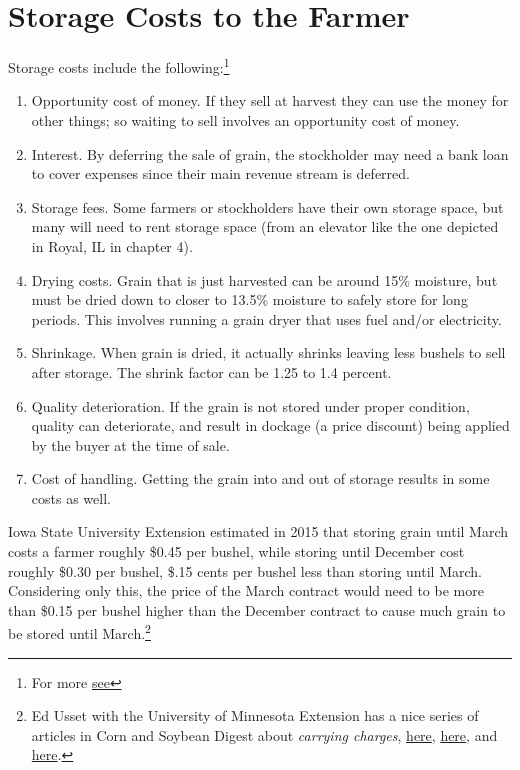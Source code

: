 \documentclass[
]{book}
\providecommand{\tightlist}{%
  \setlength{\itemsep}{0pt}\setlength{\parskip}{0pt}}
\begin{document}
\hypertarget{storage-costs-to-the-farmer}{%
\section{Storage Costs to the Farmer}\label{storage-costs-to-the-farmer}}

Storage costs include the following:\footnote{For more \href{https://www.extension.iastate.edu/agdm/crops/pdf/a2-33.pdf}{see}}

\begin{enumerate}
\def\labelenumi{\arabic{enumi}.}
\tightlist
\item
  Opportunity cost of money. If they sell at harvest they can use the money for other things; so waiting to sell involves an opportunity cost of money.
\item
  Interest. By deferring the sale of grain, the stockholder may need a bank loan to cover expenses since their main revenue stream is deferred.
\item
  Storage fees. Some farmers or stockholders have their own storage space, but many will need to rent storage space (from an elevator like the one depicted in Royal, IL in chapter 4).
\item
  Drying costs. Grain that is just harvested can be around 15\% moisture, but must be dried down to closer to 13.5\% moisture to safely store for long periods. This involves running a grain dryer that uses fuel and/or electricity.
\item
  Shrinkage. When grain is dried, it actually shrinks leaving less bushels to sell after storage. The shrink factor can be 1.25 to 1.4 percent.
\item
  Quality deterioration. If the grain is not stored under proper condition, quality can deteriorate, and result in dockage (a price discount) being applied by the buyer at the time of sale.
\item
  Cost of handling. Getting the grain into and out of storage results in some costs as well.
\end{enumerate}

Iowa State University Extension estimated in 2015 that storing grain until March costs a farmer roughly \$0.45 per bushel, while storing until December cost roughly \$0.30 per bushel, \$.15 cents per bushel less than storing until March. Considering only this, the price of the March contract would need to be more than \$0.15 per bushel higher than the December contract to cause much grain to be stored until March.\footnote{Ed Usset with the University of Minnesota Extension has a nice series of articles in Corn and Soybean Digest about \emph{carrying charges}, \href{http://www.cornandsoybeandigest.com/marketing/understand-carrying-charges}{here}, \href{http://www.cornandsoybeandigest.com/carrying-charges-part-1}{here}, and \href{http://www.cornandsoybeandigest.com/carrying-charges-part-2}{here}.}
\end{document}
